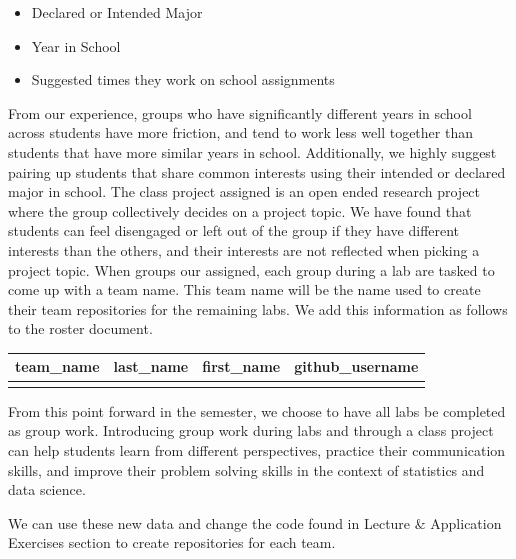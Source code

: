 \documentclass[
  12pt]{article}
\begin{document}
\begin{itemize}
\item
  Declared or Intended Major
\item
  Year in School
\item
  Suggested times they work on school assignments
\end{itemize}

From our experience, groups who have significantly different years in
school across students have more friction, and tend to work less well
together than students that have more similar years in school.
Additionally, we highly suggest pairing up students that share common
interests using their intended or declared major in school. The class
project assigned is an open ended research project where the group
collectively decides on a project topic. We have found that students can
feel disengaged or left out of the group if they have different
interests than the others, and their interests are not reflected when
picking a project topic. When groups our assigned, each group during a
lab are tasked to come up with a team name. This team name will be the
name used to create their team repositories for the remaining labs. We
add this information as follows to the roster document.

\begin{longtable}[]{@{}llll@{}}
\toprule\noalign{}
team\_name & last\_name & first\_name & github\_username \\
\midrule\noalign{}
\endhead
\bottomrule\noalign{}
\endlastfoot
& & & \\
\end{longtable}

From this point forward in the semester, we choose to have all labs be
completed as group work. Introducing group work during labs and through
a class project can help students learn from different perspectives,
practice their communication skills, and improve their problem solving
skills in the context of statistics and data science.

We can use these new data and change the code found in Lecture \&
Application Exercises section to create repositories for each team.
\end{document}
